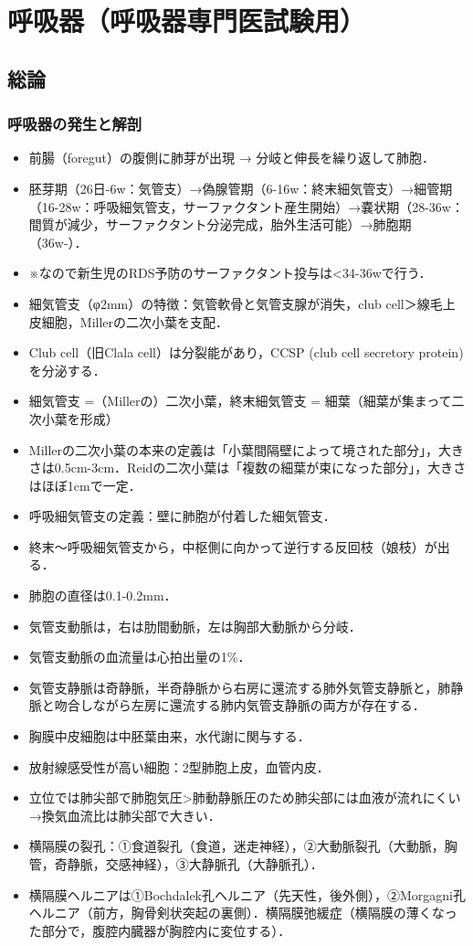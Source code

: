 

\section{呼吸器（呼吸器専門医試験用）}

\subsection{総論}

\subsubsection{呼吸器の発生と解剖}

\begin{itemize}
\item 前腸（foregut）の腹側に肺芽が出現 → 分岐と伸長を繰り返して肺胞．
\item 胚芽期（26日-6w：気管支）→偽腺管期（6-16w：終末細気管支）→細管期（16-28w：呼吸細気管支，サーファクタント産生開始）→嚢状期（28-36w：間質が減少，サーファクタント分泌完成，胎外生活可能）→肺胞期（36w-）．
\item ※なので新生児のRDS予防のサーファクタント投与は<34-36wで行う．
\item 細気管支（φ2mm）の特徴：気管軟骨と気管支腺が消失，club cell＞線毛上皮細胞，Millerの二次小葉を支配．
\item Club cell（旧Clala cell）は分裂能があり，CCSP (club cell secretory protein)を分泌する．
\item 細気管支 =（Millerの）二次小葉，終末細気管支 = 細葉（細葉が集まって二次小葉を形成）
\item Millerの二次小葉の本来の定義は「小葉間隔壁によって境された部分」，大きさは0.5cm-3cm．Reidの二次小葉は「複数の細葉が束になった部分」，大きさはほぼ1cmで一定．
\item 呼吸細気管支の定義：壁に肺胞が付着した細気管支．
\item 終末〜呼吸細気管支から，中枢側に向かって逆行する反回枝（娘枝）が出る．
\item 肺胞の直径は0.1-0.2mm．
\item 気管支動脈は，右は肋間動脈，左は胸部大動脈から分岐．
\item 気管支動脈の血流量は心拍出量の1\%．
\item 気管支静脈は奇静脈，半奇静脈から右房に還流する肺外気管支静脈と，肺静脈と吻合しながら左房に還流する肺内気管支静脈の両方が存在する．
\item 胸膜中皮細胞は中胚葉由来，水代謝に関与する．
\item 放射線感受性が高い細胞：2型肺胞上皮，血管内皮．
\item 立位では肺尖部で肺胞気圧>肺動静脈圧のため肺尖部には血液が流れにくい→換気血流比は肺尖部で大きい．
\item 横隔膜の裂孔：①食道裂孔（食道，迷走神経），②大動脈裂孔（大動脈，胸管，奇静脈，交感神経），③大静脈孔（大静脈孔）．
\item 横隔膜ヘルニアは①Bochdalek孔ヘルニア（先天性，後外側），②Morgagni孔ヘルニア（前方，胸骨剣状突起の裏側）．横隔膜弛緩症（横隔膜の薄くなった部分で，腹腔内臓器が胸腔内に変位する）．


\end{itemize}
